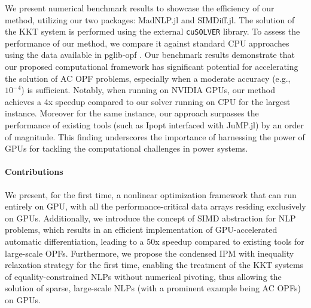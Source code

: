 We present numerical benchmark results to showcase the efficiency of
our method, utilizing our two packages: MadNLP.jl and
SIMDiff.jl. The solution of the KKT system is performed using the
external {\tt cuSOLVER} library. To assess the performance of our method, we
compare it against standard CPU approaches using the data available in
pglib-opf \cite{babaeinejadsarookolaee2019power}.  Our benchmark results
demonstrate that our proposed computational framework has significant
potential for accelerating the solution of AC OPF problems, especially
when a moderate accuracy (e.g., $10^{-4}$) is sufficient.
Notably, when running on NVIDIA GPUs, our method achieves a
4x speedup compared to our solver running on CPU for
the largest instance. Moreover for the same instance, our approach
surpasses the performance of existing tools (such as Ipopt interfaced
with JuMP.jl) by an order of magnitude. This finding underscores the
importance of harnessing the power of GPUs for tackling
the computational challenges in power systems.

\paragraph*{Contributions}
We present, for the first time, a nonlinear optimization framework
that can run entirely on GPU, with all the performance-critical data
arrays residing exclusively on GPUs. Additionally, we introduce the
concept of SIMD abstraction for NLP problems, which results in an
efficient implementation of GPU-accelerated automatic differentiation,
leading to a 50x speedup compared to existing tools for large-scale
OPFs. Furthermore, we propose the condensed IPM with inequality
relaxation strategy for the first time, enabling the treatment of the
KKT systems of equality-constrained NLPs without numerical pivoting,
thus allowing the solution of sparse, large-scale NLPs (with a
prominent example being AC OPFs) on GPUs.

